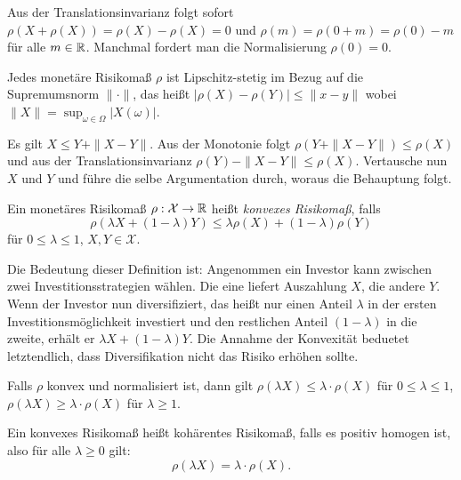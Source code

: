 \documentclass[a4paper,twoside,DIV15,BCOR12mm]{scrbook}
\newcommand{\cX}{\mathcal X}
\begin{document}
Aus der Translationsinvarianz folgt sofort $\rho(X + \rho(X)) = \rho(X) - \rho(X) = 0$ und $\rho(m) = \rho(0+m) = \rho(0) - m$ für alle $m\in\mathbb{R}$. Manchmal fordert man die Normalisierung $\rho(0)=0$.

\begin{satz}
Jedes monetäre Risikomaß $\rho$ ist Lipschitz-stetig im Bezug auf die Supremumsnorm $\|\cdot\|$, das heißt $|\rho(X) -\rho(Y)|\le \|x-y\|$ wobei $\|X\| = \sup_{\omega\in\Omega}|X(\omega)|$. 
\end{satz}

\begin{beweis}
Es gilt $X\le Y+\|X-Y\|$. Aus der Monotonie folgt $\rho(Y+\|X-Y\|) \le \rho(X)$ und aus der Translationsinvarianz $\rho(Y)-\|X-Y\| \le \rho(X)$. Vertausche nun $X$ und $Y$ und führe die selbe Argumentation durch, woraus die Behauptung folgt.
\end{beweis}

\begin{definition}
Ein monetäres Risikomaß $\rho:\cX \to \MdR$ heißt \emph{konvexes Risikomaß}, falls 
\[
\rho(\lambda X + (1-\lambda)Y) \le \lambda \rho(X) + (1- \lambda)\rho(Y)
\]
für $0\le \lambda \le 1$, $X,Y\in\cX$.
\end{definition}

Die Bedeutung dieser Definition ist: Angenommen ein Investor kann zwischen zwei Investitionsstrategien wählen. Die eine liefert Auszahlung $X$, die andere $Y$. Wenn der Investor nun diversifiziert, das heißt nur einen Anteil $\lambda$ in der ersten Investitionsmöglichkeit investiert und den restlichen Anteil $(1-\lambda)$ in die zweite, erhält er $\lambda X + (1-\lambda)Y$. Die Annahme der Konvexität beduetet letztendlich, dass Diversifikation nicht das Risiko erhöhen sollte.

Falls $\rho$ konvex und normalisiert ist, dann gilt $\rho(\lambda X)\leq \lambda \cdot \rho(X)$ für $0\leq\lambda\leq 1$, $\rho(\lambda X)\geq \lambda \cdot \rho(X)$ für $\lambda\geq 1$.

\begin{definition}
Ein konvexes Risikomaß heißt kohärentes Risikomaß, falls es positiv homogen ist, also für alle $\lambda\geq 0$ gilt: 
\[
\rho(\lambda X)=\lambda\cdot \rho (X).
\]
\end{definition}
\end{document}
